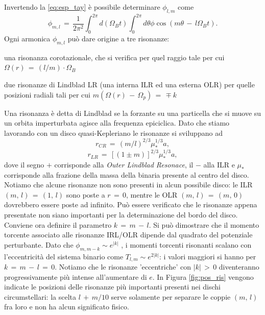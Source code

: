 Invertendo la \eqref{eq:esp_tay} è possibile determinare $\phi_{l,m}$ \parencite{ArtymowiczLubow1994} come
\begin{equation}
\phi_{m,l}\,=\,\frac{1}{2\pi^2}\int_0^{2\pi}d(\Omega_Bt) \int_0^{2\pi} d\theta \phi \cos{(m\theta\,-\,l\Omega_Bt)}.
\label{eq:singpot_shape}
\end{equation}
Ogni armonica $\phi_{m,l}$ può dare origine a tre risonanze:
\begin{list}{\textbf{-}}{\setlength{\itemsep}{0cm}}
    \item una risonanza corotazionale, che si verifica per quel raggio tale per cui $\Omega(r)\,=\,(l/m) \cdot \Omega_{B}$
    \item due risonanze di Lindblad LR (una interna ILR ed una esterna OLR) per quelle posizioni radiali tali per cui $m(\Omega(r)\,-\,\Omega_p)\,=\,\mp k$
\end{list}
Una risonanza è detta di Lindblad se la forzante su una particella che si muove su un orbita imperturbata agisce alla frequenza epiciclica. Dato che stiamo lavorando con un disco quasi-Kepleriano le risonanze si sviluppano ad
\begin{equation}
r_{CR}\,=\,(m/l)^{2/3}\mu_\ast^{1/3}a,
\label{eq:pos_corot}
\end{equation}
\begin{equation}
r_{LR}\,=\,[(1\pm m)]^{2/3} \mu_\ast^{1/3}a,
\label{eq:pos_lind}
\end{equation}
dove il segno $+$ corrisponde alla \textit{Outer Lindblad Resonace}, il $-$ alla ILR e $\mu_\ast$ corrisponde alla frazione della massa della binaria presente al centro del disco. Notiamo che alcune risonanze non sono presenti in alcun possibile disco: le ILR $(m,\,l)\,=\,(1,\,l)$ sono poste a $r\,=\,0$, mentre le OLR $(m,\,l)\,=\,(m,\,0)$ dovrebbero essere poste ad infinito. Può essere verificato che le risonanze appena presentate non siano importanti per la determinazione del bordo del disco.\\

Conviene ora definire il parametro $k\,=\,m\,-\,l$. Si può dimostrare che il momento torcente associato alle risonanze IRL/OLR dipende dal quadrato del potenziale perturbante. Dato che $\phi_{m,m-k} \sim e^{|k|}$ \parencite{GoldreichTremaine1980}, i momenti torcenti risonanti scalano con l'eccentricità del sistema binario come $T_{l,m} \sim e^{2 |k|}$: i valori maggiori si hanno per $k\,=\,m\,-\,l\,=\,0$. Notiamo che le risonanze 'eccentriche' con $|k|\,>\,0$ diventeranno progressivamente più intense all'aumentare di $e$. 
In Figura \ref{fig:pos_ris} vengono indicate le posizioni delle risonanze più importanti presenti nei dischi circumstellari: la scelta $l\,+\,m/10$ serve solamente per separare le coppie $(m,\,l)$ fra loro e non ha alcun significato fisico.

